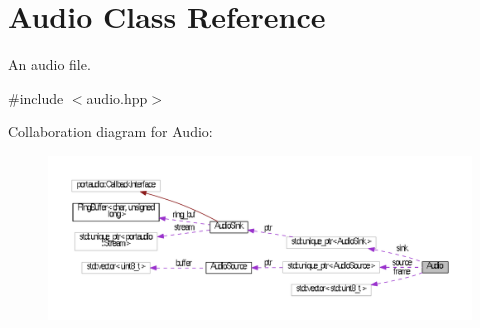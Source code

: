 \hypertarget{classAudio}{\section{Audio Class Reference}
\label{classAudio}
}


An audio file.  




{\ttfamily \#include $<$audio.\+hpp$>$}



Collaboration diagram for Audio\+:
\nopagebreak
\begin{figure}[H]
\begin{center}
\leavevmode
\includegraphics[width=350pt]{classAudio__coll__graph}
\end{center}
\end{figure}
